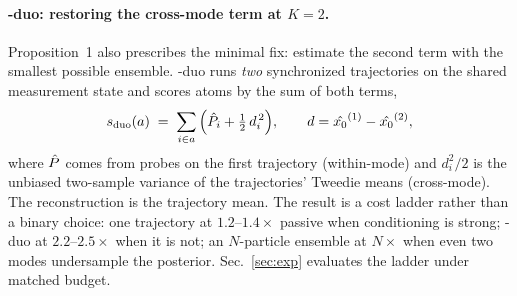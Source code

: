\paragraph{\pvas-duo: restoring the cross-mode term at $K{=}2$.}
Proposition~1 also prescribes the minimal fix: estimate the second term
with the smallest possible ensemble. \pvas-duo runs \emph{two}
synchronized trajectories on the shared measurement state and scores
atoms by the sum of both terms,
\begin{equation}
  s_{\mathrm{duo}}(a) \;=\; \sum_{i \in a} \Big( \hat{P}_i + \tfrac{1}{2}\, d_i^{\,2} \Big),
  \qquad d = \hat{x_0}^{(1)} - \hat{x_0}^{(2)},
  \label{eq:duo}
\end{equation}
where $\hat{P}$ comes from probes on the first trajectory (within-mode) and
$d_i^2/2$ is the unbiased two-sample variance of the trajectories'
Tweedie means (cross-mode). The reconstruction is the trajectory mean.
The result is a cost ladder rather than a binary choice: one trajectory
at $1.2$--$1.4\times$ passive \nfe{} when conditioning is strong;
\pvas-duo at $2.2$--$2.5\times$ when it is not; an $N$-particle ensemble
at $N\times$ when even two modes undersample the posterior.
Sec.~\ref{sec:exp} evaluates the ladder under matched budget.
